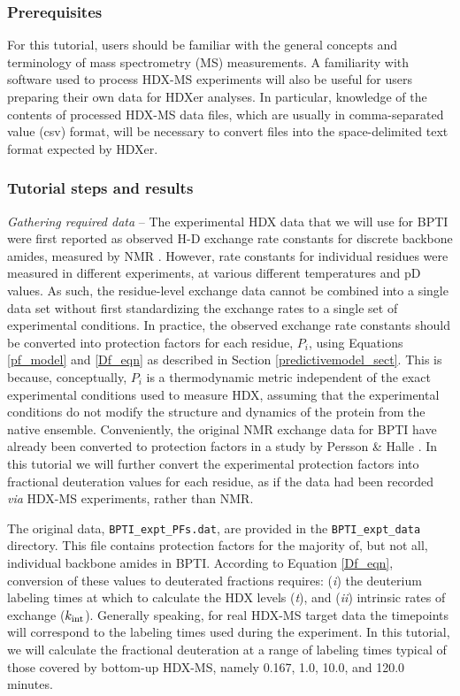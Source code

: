 \documentclass[9pt,tutorial]{livecoms}
\begin{document}
\subsubsection{Prerequisites}
For this tutorial, users should be familiar with the general concepts and terminology of mass spectrometry (MS) measurements. 
A familiarity with software used to process HDX-MS experiments will also be useful for users preparing their own data for HDXer analyses.
In particular, knowledge of the contents of processed HDX-MS data files, which are usually in comma-separated value (csv) format, will be necessary to convert files into the space-delimited text format expected by HDXer.

\subsubsection{Tutorial steps and results}

\textit{Gathering required data} -- The experimental HDX data that we will use for BPTI were first reported as observed H-D exchange rate constants for discrete backbone amides, measured by NMR \cite{Kim1993, Battiste2002}. 
However, rate constants for individual residues were measured in different experiments, at various different temperatures and pD values.
As such, the residue-level exchange data cannot be combined into a single data set without first standardizing the exchange rates to a single set of experimental conditions.
In practice, the observed exchange rate constants should be converted into protection factors for each residue, $P_i$, using Equations \ref{pf_model} and \ref{Df_eqn} as described in Section \ref{predictivemodel_sect}.
This is because, conceptually, $P_i$ is a thermodynamic metric independent of the exact experimental conditions used to measure HDX, assuming that the experimental conditions do not modify the structure and dynamics of the protein from the native ensemble.
Conveniently, the original NMR exchange data for BPTI have already been converted to protection factors in a study by Persson \& Halle \cite{Persson2015}.
In this tutorial we will further convert the experimental protection factors into fractional deuteration values for each residue, as if the data had been recorded \textit{via} HDX-MS experiments, rather than NMR. 

The original data, \texttt{BPTI\_expt\_PFs.dat}, are provided in the \texttt{BPTI\_expt\_data} directory.
This file contains protection factors for the majority of, but not all, individual backbone amides in BPTI.
According to Equation \ref{Df_eqn}, conversion of these values to deuterated fractions requires: (\textit{i}) the deuterium labeling times at which to calculate the HDX levels (\textit{t}), and (\textit{ii}) intrinsic rates of exchange ($k_\textnormal{int}$).
Generally speaking, for real HDX-MS target data the timepoints will correspond to the labeling times used during the experiment.
In this tutorial, we will calculate the fractional deuteration at a range of labeling times typical of those covered by bottom-up HDX-MS, namely 0.167, 1.0, 10.0, and 120.0 minutes. 
\end{document}
